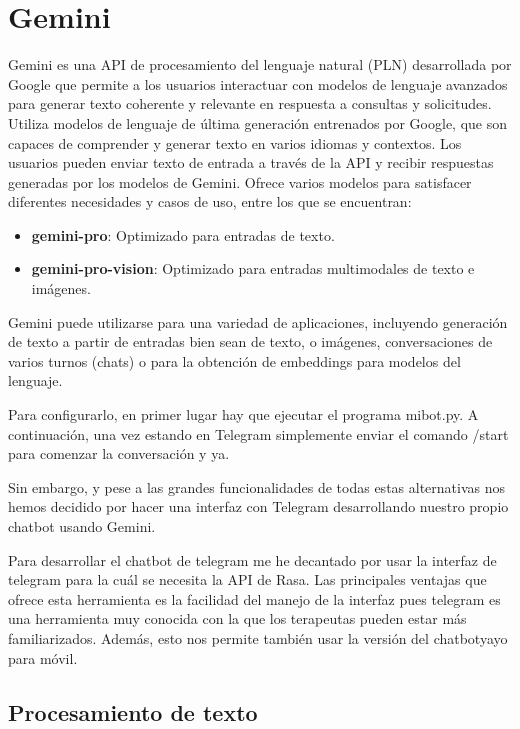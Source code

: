 \section{Gemini}
\label{sec:gemini}

Gemini es una API de procesamiento del lenguaje natural (PLN) desarrollada por Google que permite a los usuarios interactuar con modelos de lenguaje avanzados para generar texto coherente y relevante en respuesta a consultas y solicitudes. Utiliza modelos de lenguaje de última generación entrenados por Google, que son capaces de comprender y generar texto en varios idiomas y contextos. Los usuarios pueden enviar texto de entrada a través de la API y recibir respuestas generadas por los modelos de Gemini. Ofrece varios modelos para satisfacer diferentes necesidades y casos de uso, entre los que se encuentran:
\begin{itemize}[label=$\bullet$, leftmargin=*]
	\item \textbf{gemini-pro}: Optimizado para entradas de texto.
	\item \textbf{gemini-pro-vision}: Optimizado para entradas multimodales de texto e imágenes.
\end{itemize}

Gemini puede utilizarse para una variedad de aplicaciones, incluyendo generación de texto a partir de entradas bien sean de texto, o imágenes, conversaciones de varios turnos (chats) o para la obtención de embeddings para modelos del lenguaje. 

Para configurarlo, en primer lugar hay que ejecutar el programa mibot.py. A continuación, una vez estando en Telegram simplemente enviar el comando /start para comenzar la conversación y ya. 

Sin embargo, y pese a las grandes funcionalidades de todas estas alternativas nos hemos decidido por hacer una interfaz con Telegram desarrollando nuestro propio chatbot usando Gemini. 

Para desarrollar el chatbot de telegram me he decantado por usar la interfaz de telegram para la cuál se necesita la API de Rasa. Las principales ventajas que ofrece esta herramienta es la facilidad del manejo de la interfaz pues telegram es una herramienta muy conocida con la que los terapeutas pueden estar más familiarizados. Además, esto nos permite también usar la versión del chatbotyayo para móvil. 

\subsection{Procesamiento de texto}

